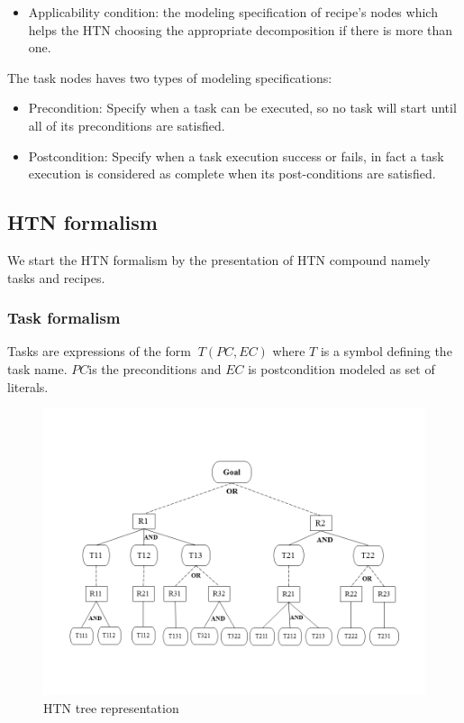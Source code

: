 \begin{itemize}
	\item Applicability condition: the modeling specification of recipe's nodes which helps the HTN choosing the appropriate decomposition if there is more than	one.
\end{itemize}
The task nodes haves two types of modeling specifications:
\begin{itemize}
	\item Precondition: Specify when a task can be executed, so no task will start until all of its preconditions are satisfied.
	\item Postcondition: Specify when a task execution success or fails, in fact a task execution is considered as complete when its post-conditions are satisfied.
\end{itemize}
\subsection{HTN formalism}
We start the HTN formalism by the presentation of HTN compound namely tasks and recipes.
\subsubsection{Task formalism}
Tasks are expressions of the form $\ T (PC, EC) $ where $T$ is a symbol defining the task name. $ PC $is the preconditions and $ EC$ is postcondition modeled as set of literals. 
\begin{figure}[h]
	\centering
	\includegraphics[width=\textwidth]{Pictures/htn1.png}
	\caption{\label{HTN tree representation} HTN tree representation}
\end{figure}


